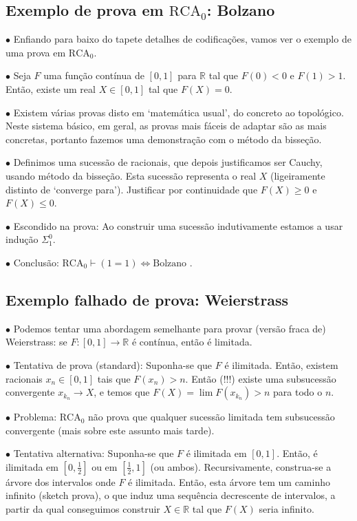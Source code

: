 \documentclass{article}
\theoremstyle{nonumberplain}
\newcommand{\R}{\mathbb{R}}
\newcommand{\RCA}{\mathrm{RCA}}
\newcommand\point[1]{\noindent \hspace{\labelsep} $\bullet$ #1 \smallskip}
\newcommand\timestamp[1]{}
\begin{document}
\timestamp{34 min}

\subsection{Exemplo de prova em $\RCA_0$: Bolzano}

\point{Enfiando para baixo do tapete detalhes de codificações, vamos ver o exemplo de uma prova em $\RCA_0$.}

\point{Seja $F$ uma função contínua de $[0,1]$ para $\R$ tal que $F(0) < 0$ e $F(1) > 1$. Então, existe um real $X \in [0,1]$ tal que $F(X) = 0$.}

\point{Existem várias provas disto em `matemática usual', do concreto ao topológico. Neste sistema básico, em geral, as provas mais fáceis de adaptar são as mais concretas, portanto fazemos uma demonstração com o método da bisseção.}

\point{Definimos uma sucessão de racionais, que depois justificamos ser Cauchy, usando método da bisseção. Esta sucessão representa o real $X$ (ligeiramente distinto de `converge para'). Justificar por continuidade que $F(X) \geq 0$ e $F(X) \leq 0$.}

\point{Escondido na prova: Ao construir uma sucessão indutivamente estamos a usar indução $\Sigma^0_1$.}

\point{Conclusão: $\RCA_0 \vdash (1 = 1) \iff \text{Bolzano}$}.

\timestamp{40 min}

\subsection{Exemplo falhado de prova: Weierstrass}

\point{Podemos tentar uma abordagem semelhante para provar (versão fraca de) Weierstrass: se $F \colon [0,1] \to \R$ é contínua, então é limitada.}

\point{Tentativa de prova (standard): Suponha-se que $F$ é ilimitada. Então, existem racionais $x_n \in [0,1]$ tais que $F(x_n) > n$. Então (!!!) existe uma subsucessão convergente $x_{k_n} \to X$, e temos que $F(X) = \lim F(x_{k_n}) > n$ para todo o $n$.}

\point{Problema: $\RCA_0$ não prova que qualquer sucessão limitada tem subsucessão convergente (mais sobre este assunto mais tarde).}

\point{Tentativa alternativa: Suponha-se que $F$ é ilimitada em $[0,1]$. Então, é ilimitada em $[0,\frac12]$ ou em $[\frac12,1]$ (ou ambos). Recursivamente, construa-se a árvore dos intervalos onde $F$ é ilimitada. Então, esta árvore tem um caminho infinito (sketch prova), o que induz uma sequência decrescente de intervalos, a partir da qual conseguimos construir $X \in \R$ tal que $F(X)$ seria infinito.}
\end{document}
